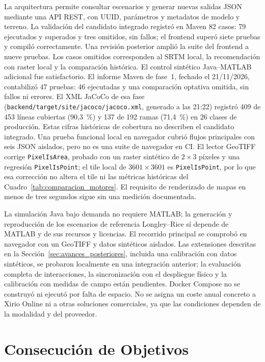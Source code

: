 La arquitectura permite consultar escenarios y generar nuevas salidas JSON mediante una API REST, con UUID, parámetros y metadatos de modelo y terreno. La validación del candidato integrado registró en Maven 82 casos: 79 ejecutados y superados y tres omitidos, sin fallos; el frontend superó siete pruebas y compiló correctamente. Una revisión posterior amplió la suite del frontend a nueve pruebas. Los casos omitidos corresponden al SRTM local, la recomendación con raster local y la comparación histórica. El control sintético Java--MATLAB adicional fue satisfactorio. El informe Maven de fase~1, fechado el 21/11/2026, contabilizó 47 pruebas: 46 ejecutadas y una comparación optativa omitida, sin fallos ni errores. El XML JaCoCo de esa fase (\texttt{backend/target/site/jacoco/jacoco.xml}, generado a las 21:22) registró 409 de 453 líneas cubiertas (90,3~\%) y 137 de 192 ramas (71,4~\%) en 26 clases de producción. Estas cifras históricas de cobertura no describen el candidato integrado. Una prueba funcional local en navegador cubrió flujos principales con seis JSON aislados, pero no es una suite de navegador en CI. El lector GeoTIFF corrige \texttt{PixelIsArea}, probado con un raster sintético de $2\times3$ píxeles y una regresión \texttt{PixelIsPoint}; el tile local de $3601\times3601$ es \texttt{PixelIsPoint}, por lo que esa corrección no altera el tile ni las métricas históricas del Cuadro~\ref{tab:comparacion_motores}. El requisito de renderizado de mapas en menos de tres segundos sigue sin una medición documentada.

La simulación Java bajo demanda no requiere MATLAB; la generación y reproducción de los escenarios de referencia Longley--Rice sí depende de MATLAB y de sus recursos y licencias. El recorrido principal se comprobó en navegador con un GeoTIFF y datos sintéticos aislados. Las extensiones descritas en la Sección~\ref{sec:avances_posteriores}, incluida una calibración con datos sintéticos, se probaron localmente en una integración anterior; la evaluación completa de interacciones, la sincronización con el despliegue físico y la calibración con medidas de campo están pendientes. Docker Compose no se construyó ni ejecutó por falta de espacio. No se asigna un coste anual concreto a Xirio Online ni a otras soluciones comerciales, ya que las condiciones dependen de la modalidad y del proveedor.

\section{Consecución de Objetivos}
\label{sec:objetivos_conseguidos}

